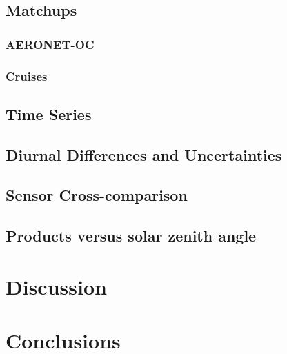 \documentclass[12pt]{spieman}  %
\begin{document}
\begin{spacing}{2}
\subsection{Matchups}
\subsubsection{AERONET-OC}

\subsubsection{Cruises}

\subsection{Time Series}

\subsection{Diurnal Differences and Uncertainties}

\subsection{Sensor Cross-comparison}

\subsection{Products versus solar zenith angle}


\section{Discussion}

\section{Conclusions}


\end{spacing}
\end{document}
